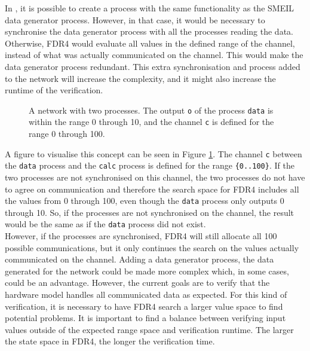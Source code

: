 In \cspm{}, it is possible to create a process with the same functionality as the SMEIL data generator process. However, in that case, it would be necessary to synchronise the data generator process with all the processes reading the data. Otherwise, FDR4 would evaluate all values in the defined range of the channel, instead of what was actually communicated on the channel. This would make the data generator process redundant. This extra synchronisation and process added to the \cspm{} network will increase the complexity, and it might also increase the runtime of the verification.
\begin{figure}
    \centering
    \caption{A \cspm{} network with two processes. The output \texttt{o} of the process \texttt{data} is within the range 0 through 10, and the channel \texttt{c} is defined for the range 0 through 100.}
    \label{fig:csp_data_generator_process}
\end{figure}
A figure to visualise this concept can be seen in Figure \ref{fig:csp_data_generator_process}. The channel \texttt{c} between the \texttt{data} process and the \texttt{calc} process is defined for the range \texttt{\{0..100\}}. If the two processes are not synchronised on this channel, the two processes do not have to agree on communication and therefore the search space for FDR4 includes all the values from 0 through 100, even though the \texttt{data} process only outputs 0 through 10. So, if the processes are not synchronised on the channel, the result would be the same as if the \texttt{data} process did not exist. \\

However, if the processes are synchronised, FDR4 will still allocate all 100 possible communications, but it only continues the search on the values actually communicated on the channel.
Adding a data generator process, the data generated for the network could be made more complex which, in some cases, could be an advantage. However, the current goals are to verify that the hardware model handles all communicated data as expected. For this kind of verification, it is necessary to have FDR4 search a larger value space to find potential problems. It is important to find a balance between verifying input values outside of the expected range space and verification runtime. The larger the state space in FDR4, the longer the verification time.

